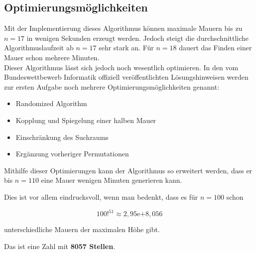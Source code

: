 \documentclass[a4paper,12pt]{article}
\begin{document}
\subsection{Optimierungsmöglichkeiten}
Mit der Implementierung dieses Algorithmus können maximale Mauern bis zu $n = 17$ in wenigen Sekunden erzeugt werden. Jedoch steigt die durchschnittliche Algorithmuslaufzeit ab $n = 17$ sehr stark an. Für $n = 18$ dauert das Finden einer Mauer schon mehrere Minuten.
\\[0.4cm]
Dieser Algorithmus lässt sich jedoch noch wesentlich optimieren. In den vom Bundeswettbewerb Informatik offiziell veröffentlichten Lösungshinweisen werden zur ersten Aufgabe noch mehrere Optimierungsmöglichkeiten genannt:
\begin{itemize}
\item Randomized Algorithm
\item Kopplung und Spiegelung einer halben Mauer
\item Einschränkung des Suchraums
\item Ergänzung vorheriger Permutationen
\end{itemize}

Mithilfe dieser Optimierungen kann der Algorithmus so erweitert werden, dass er bis $n = 110$ eine Mauer wenigen Minuten generieren kann.

Dies ist vor allem eindrucksvoll, wenn man bedenkt, dass es für $n = 100$ schon
\begin{center}
\begin{Large}
\[100!^{51} \approx 2,95\mathrm{e}{+8,056}\]
\end{Large}
\end{center}
unterschiedliche Mauern der maximalen Höhe gibt.

Das ist eine Zahl mit \textbf{8057 Stellen}.
\end{document}
